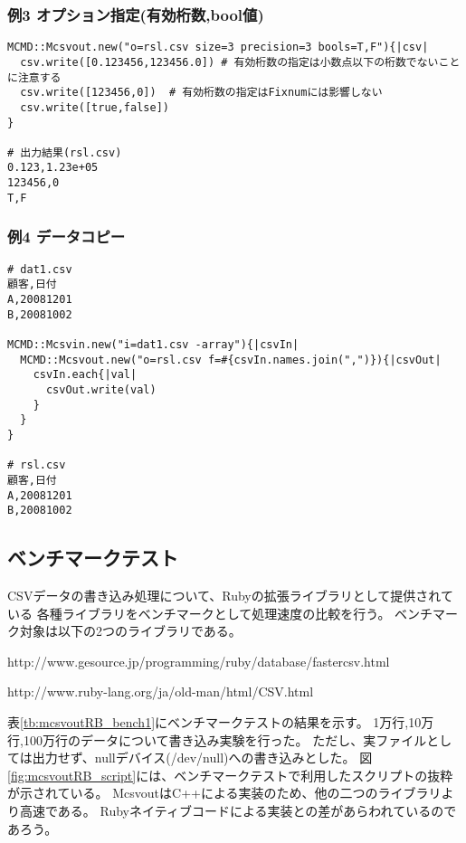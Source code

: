 \subsubsection*{例3 オプション指定(有効桁数,bool値)}

\begin{Verbatim}[baselinestretch=0.7,frame=single]
MCMD::Mcsvout.new("o=rsl.csv size=3 precision=3 bools=T,F"){|csv|
  csv.write([0.123456,123456.0]) # 有効桁数の指定は小数点以下の桁数でないことに注意する
  csv.write([123456,0])  # 有効桁数の指定はFixnumには影響しない
  csv.write([true,false])
}

# 出力結果(rsl.csv)
0.123,1.23e+05
123456,0
T,F
\end{Verbatim}

\subsubsection*{例4 データコピー}

\begin{Verbatim}[baselinestretch=0.7,frame=single]
# dat1.csv
顧客,日付
A,20081201
B,20081002

MCMD::Mcsvin.new("i=dat1.csv -array"){|csvIn|
  MCMD::Mcsvout.new("o=rsl.csv f=#{csvIn.names.join(",")}){|csvOut|
    csvIn.each{|val|
      csvOut.write(val)
    }
  }
}

# rsl.csv
顧客,日付
A,20081201
B,20081002
\end{Verbatim}

\subsection{ベンチマークテスト}

CSVデータの書き込み処理について、Rubyの拡張ライブラリとして提供されている
各種ライブラリをベンチマークとして処理速度の比較を行う。
ベンチマーク対象は以下の2つのライブラリである。

\begin{description}
\setlength{\itemindent}{0mm}
\item[FasterCSV] http://www.gesource.jp/programming/ruby/database/fastercsv.html
\item[CSV] http://www.ruby-lang.org/ja/old-man/html/CSV.html
\end{description}

表\ref{tb:mcsvoutRB_bench1}にベンチマークテストの結果を示す。
1万行,10万行,100万行のデータについて書き込み実験を行った。
ただし、実ファイルとしては出力せず、nullデバイス(/dev/null)への書き込みとした。
図\ref{fig:mcsvoutRB_script}には、ベンチマークテストで利用したスクリプトの抜粋が示されている。
McsvoutはC++による実装のため、他の二つのライブラリより高速である。
Rubyネイティブコードによる実装との差があらわれているのであろう。

